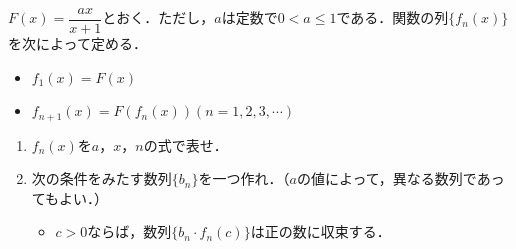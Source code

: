 \documentclass[../../main.tex]{subfiles}
\begin{document}
$F(x)=\dfrac{ax}{x+1}$とおく．ただし，$a$は定数で$0 < a\le 1$である．関数の列$\{f_n(x)\}$を次によって定める．

\begin{itemize}
  \item[(i)] $f_1(x)=F(x)$
  \item[(ii)] $f_{n+1}(x)=F(f_n(x)) (n=1,2,3,\cdots)$
\end{itemize}
\begin{enumerate}
  \item $f_n(x)$を$a$，$x$，$n$の式で表せ．
  \item 次の条件をみたす数列$\{b_n\}$を一つ作れ．（$a$の値によって，異なる数列であってもよい．）
    \begin{itemize}
      \item[条件] $c>0$ならば，数列$\{b_n\cdot f_n(c)\}$は正の数に収束する．
    \end{itemize}
\end{enumerate}
\end{document}
